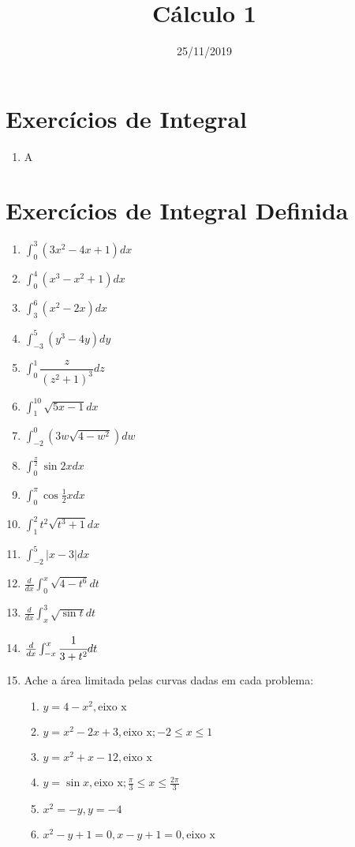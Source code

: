 \documentclass{article}
\title{Cálculo 1}
\date{25/11/2019}
\begin{document}
\maketitle

\section*{Exercícios de Integral}

\begin{enumerate}
    \item A
\end{enumerate}

\section*{Exercícios de Integral Definida}

\begin{enumerate}
    \item $\int_{0}^{3}(3x^2-4x+1)dx$
    \item $\int_{0}^{4}(x^3-x^2+1)dx$
    \item $\int_{3}^{6}(x^2-2x)dx$
    \setcounter{enumi}{5}
    \item $\int_{-3}^{5}(y^3-4y)dy$
    \item $\int_{0}^{1}\dfrac{z}{(z^2+1)^3}dz$
    \setcounter{enumi}{8}
    \item $\int_{1}^{10}\sqrt{5x-1}dx$
    \setcounter{enumi}{10}
    \item $\int_{-2}^{0}(3w\sqrt{4-w^2})dw$
    \setcounter{enumi}{12}
    \item \large $\int_{0}^{\frac{\pi}{2}}\sin{2x}dx$
    \item \large $\int_{0}^{\pi}\cos{\frac{1}{2}x}dx$
    \item $\int_{1}^{2}t^2\sqrt{t^3+1}dx$
    \setcounter{enumi}{20}
    \item $\int_{-2}^{5}|x - 3|dx$
    \setcounter{enumi}{36}
    \item $\frac{d}{dx} \int_{0}^{x}\sqrt{4-t^6}dt$
    \setcounter{enumi}{38}
    \item $\frac{d}{dx} \int_{x}^{3}\sqrt{\sin{t}}dt$
    \setcounter{enumi}{40}
    \item $\frac{d}{dx} \int_{-x}^{x}\cfrac{1}{3+t^2}dt$
    \newpage
    \item \large Ache a área limitada pelas curvas dadas em cada problema:
    \begin{enumerate}
        \item $y = 4 - x^2, \text{eixo x}$
        \item $y = x^2 - 2x + 3, \text{eixo x}; -2 \le x \le 1$
        \item $y = x^2 + x - 12, \text{eixo x}$
        \item $y = \sin{x}, \text{eixo x}; \frac{\pi}{3} \le x \le \frac{2\pi}{3} $
        \item $x^2 = -y, y = -4$
        \item $x^2 - y + 1 = 0, x - y + 1 = 0, \text{eixo x}$
    \end{enumerate}
\end{enumerate}
\end{document}
